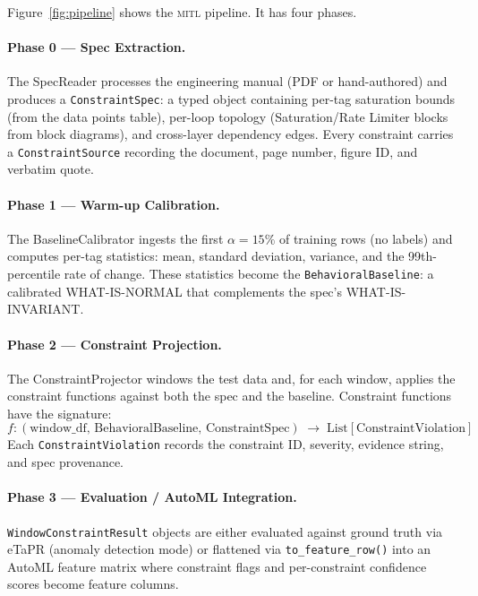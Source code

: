 \documentclass[sigconf,anonymous,review]{acmart}
\newcommand{\mitl}{\textsc{mitl}\xspace}
\begin{document}
Figure~\ref{fig:pipeline} shows the \mitl pipeline.  It has four phases.

\paragraph{Phase 0 — Spec Extraction.}
The SpecReader processes the engineering manual (PDF or hand-authored) and
produces a \texttt{ConstraintSpec}: a typed object containing per-tag
saturation bounds (from the data points table), per-loop topology
(Saturation/Rate Limiter blocks from block diagrams), and cross-layer
dependency edges.  Every constraint carries a \texttt{ConstraintSource}
recording the document, page number, figure ID, and verbatim quote.

\paragraph{Phase 1 — Warm-up Calibration.}
The BaselineCalibrator ingests the first $\alpha = 15\%$ of training rows
(no labels) and computes per-tag statistics: mean, standard deviation,
variance, and the 99th-percentile rate of change.  These statistics
become the \texttt{BehavioralBaseline}: a calibrated WHAT-IS-NORMAL that
complements the spec's WHAT-IS-INVARIANT.

\paragraph{Phase 2 — Constraint Projection.}
The ConstraintProjector windows the test data and, for each window, applies
the constraint functions against both the spec and the baseline.
Constraint functions have the signature:
\[
  f : (\text{window\_df},\, \text{BehavioralBaseline},\, \text{ConstraintSpec})
      \;\to\; \text{List}[\text{ConstraintViolation}]
\]
Each \texttt{ConstraintViolation} records the constraint ID, severity,
evidence string, and spec provenance.

\paragraph{Phase 3 — Evaluation / AutoML Integration.}
\texttt{WindowConstraintResult} objects are either evaluated against ground
truth via eTaPR (anomaly detection mode) or flattened via
\texttt{to\_feature\_row()} into an AutoML feature matrix where constraint
flags and per-constraint confidence scores become feature columns.
\end{document}
